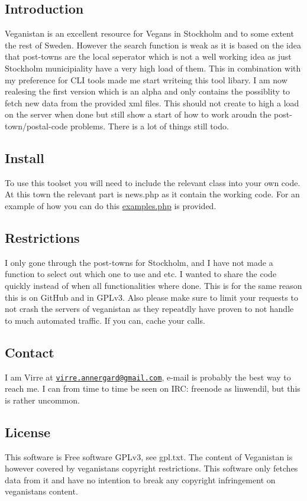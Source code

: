 \subsection*{Introduction }

Veganistan is an excellent resource for Vegans in Stockholm and to some extent the rest of Sweden. However the search function is weak as it is based on the idea that post-\/towns are the local seperator which is not a well working idea as just Stockholm municipiality have a very high load of them. This in combination with my preference for C\+L\+I tools made me start writeing this tool libary. I am now realesing the first version which is an alpha and only contains the possiblity to fetch new data from the provided xml files. This should not create to high a load on the server when done but still show a start of how to work aroudn the post-\/town/postal-\/code problems. There is a lot of things still todo.

\subsection*{Install }

To use this toolset you will need to include the relevant class into your own code. At this town the relevant part is news.\+php as it contain the working code. For an example of how you can do this \hyperlink{examples_8php}{examples.\+php} is provided.

\subsection*{Restrictions }

I only gone through the post-\/towns for Stockholm, and I have not made a function to select out which one to use and etc. I wanted to share the code quickly instead of when all functionalities where done. This is for the same reason this is on Git\+Hub and in G\+P\+Lv3. Also please make sure to limit your requests to not crash the servers of veganistan as they repeatdly have proven to not handle to much automated traffic. If you can, cache your calls.

\subsection*{Contact }

I am Virre at \href{mailto:virre.annergard@gmail.com}{\tt virre.\+annergard@gmail.\+com}, e-\/mail is probably the best way to reach me. I can from time to time be seen on I\+R\+C\+: freenode as linwendil, but this is rather uncommon.

\subsection*{License }

This software is Free software G\+P\+Lv3, see gpl.\+txt. The content of Veganistan is however covered by veganistans copyright restrictions. This software only fetches data from it and have no intention to break any copyright infringement on veganistans content. 